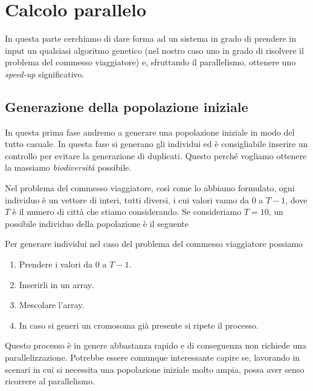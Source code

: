 \section{Calcolo parallelo}

In questa parte cerchiamo di dare forma ad un sistema in grado di prendere
in input un qualsiasi algoritmo genetico (nel nostro caso uno in grado di
risolvere il problema del commesso viaggiatore) e, sfruttando il parallelismo,
ottenere uno \emph{speed-up} significativo.

\subsection{Generazione della popolazione iniziale}

In questa prima fase andremo a generare una popolazione iniziale in modo del
tutto casuale. In questa fase si generano gli individui ed è consigliabile
inserire un controllo per evitare la generazione di duplicati. Questo perché
vogliamo ottenere la massiamo \emph{biodiversità} possibile.

Nel problema del commesso viaggiatore, così come lo abbiamo formulato, ogni
individuo è un vettore di interi, tutti diversi, i cui valori vanno da $0$ a
$T-1$, dove $T$ è il numero di città che stiamo considerando. Se consideriamo
$T = 10$, un possibile individuo della popolazione è il seguente
\begin{center}
	
\end{center}
Per generare individui nel caso del problema del commesso viaggiatore possiamo
\begin{enumerate}
	\item Prendere i valori da $0$ a $T-1$.
	\item Inserirli in un array.
	\item Mescolare l'array.
	\item In caso si generi un cromosoma già presente si ripete il processo.
\end{enumerate}
Questo processo è in genere abbastanza rapido e di conseguenza non richiede
una parallelizzazione. Potrebbe essere comunque interessante capire se,
lavorando in scenari in cui si necessita una popolazione iniziale molto ampia,
possa aver senso ricorrere al parallelismo.
